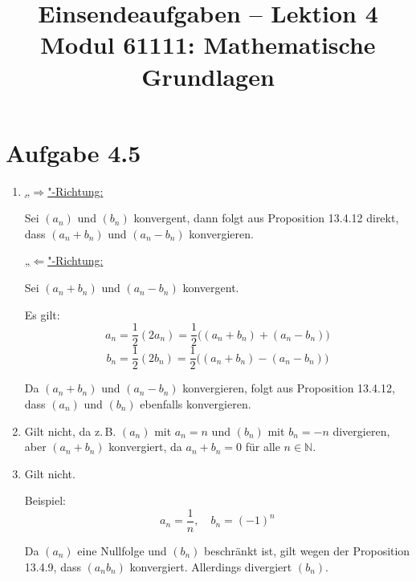 \documentclass[a4paper,12pt]{article}
\title{Einsendeaufgaben -- Lektion 4\\[0.5em]
\large Modul 61111: Mathematische Grundlagen}
\author{}
\date{}
\begin{document}
\maketitle

\section*{Aufgabe 4.5}

\begin{enumerate}[label=\alph*)]

    \item
    \underline{„$\Rightarrow$"-Richtung:}

    Sei $(a_n)$ und $(b_n)$ konvergent, dann folgt aus Proposition 13.4.12 direkt, dass
    $(a_n + b_n)$ und $(a_n - b_n)$ konvergieren.

    \underline{„$\Leftarrow$"-Richtung:}

    Sei $(a_n + b_n)$ und $(a_n - b_n)$ konvergent.

    Es gilt:
    \[
        a_n = \frac{1}{2}(2a_n) = \frac{1}{2}\bigl((a_n + b_n) + (a_n - b_n)\bigr)
    \]
    \[
        b_n = \frac{1}{2}(2b_n) = \frac{1}{2}\bigl((a_n + b_n) - (a_n - b_n)\bigr)
    \]

    Da $(a_n + b_n)$ und $(a_n - b_n)$ konvergieren, folgt aus Proposition 13.4.12,
    dass $(a_n)$ und $(b_n)$ ebenfalls konvergieren.

    \item
    Gilt nicht, da z.\,B. $(a_n)$ mit $a_n = n$ und $(b_n)$ mit $b_n = -n$ divergieren,
    aber $(a_n + b_n)$ konvergiert, da $a_n + b_n = 0$ für alle $n \in \mathbb{N}$.

    \item
    Gilt nicht.

    Beispiel:
    \[
        a_n = \frac{1}{n}, \quad b_n = (-1)^n
    \]

    Da $(a_n)$ eine Nullfolge und $(b_n)$ beschränkt ist, gilt wegen der Proposition 13.4.9,
    dass $(a_n b_n)$ konvergiert. Allerdings divergiert $(b_n)$.

\end{enumerate}
\end{document}
